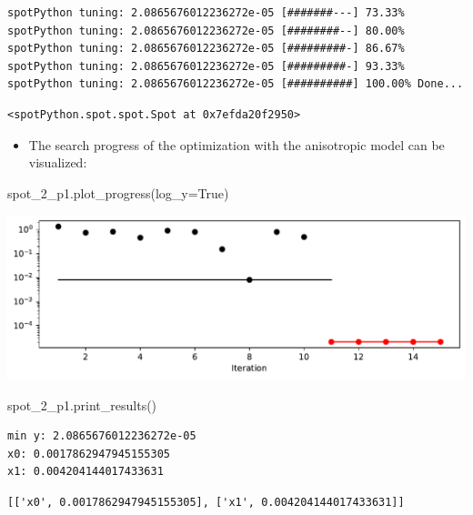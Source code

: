 \documentclass[
  letterpaper,
  DIV=11,
  numbers=noendperiod]{scrreprt}
\newenvironment{Shaded}{\begin{snugshade}}{\end{snugshade}}
\newcommand{\NormalTok}[1]{\textcolor[rgb]{0.00,0.23,0.31}{#1}}
\newcommand{\OperatorTok}[1]{\textcolor[rgb]{0.37,0.37,0.37}{#1}}
\newcommand{\VariableTok}[1]{\textcolor[rgb]{0.07,0.07,0.07}{#1}}
\providecommand{\tightlist}{%
  \setlength{\itemsep}{0pt}\setlength{\parskip}{0pt}}\usepackage{longtable,booktabs,array}
\begin{document}
\begin{verbatim}
spotPython tuning: 2.0865676012236272e-05 [#######---] 73.33% 
spotPython tuning: 2.0865676012236272e-05 [########--] 80.00% 
spotPython tuning: 2.0865676012236272e-05 [#########-] 86.67% 
spotPython tuning: 2.0865676012236272e-05 [#########-] 93.33% 
spotPython tuning: 2.0865676012236272e-05 [##########] 100.00% Done...
\end{verbatim}

\begin{verbatim}
<spotPython.spot.spot.Spot at 0x7efda20f2950>
\end{verbatim}

\begin{itemize}
\tightlist
\item
  The search progress of the optimization with the anisotropic model can
  be visualized:
\end{itemize}

\begin{Shaded}
\begin{Highlighting}[]
\NormalTok{spot\_2\_p1.plot\_progress(log\_y}\OperatorTok{=}\VariableTok{True}\NormalTok{)}
\end{Highlighting}
\end{Shaded}

\includegraphics{015_num_spot_correlation_p_files/figure-pdf/cell-10-output-1.pdf}

\begin{Shaded}
\begin{Highlighting}[]
\NormalTok{spot\_2\_p1.print\_results()}
\end{Highlighting}
\end{Shaded}

\begin{verbatim}
min y: 2.0865676012236272e-05
x0: 0.0017862947945155305
x1: 0.004204144017433631
\end{verbatim}

\begin{verbatim}
[['x0', 0.0017862947945155305], ['x1', 0.004204144017433631]]
\end{verbatim}
\end{document}
